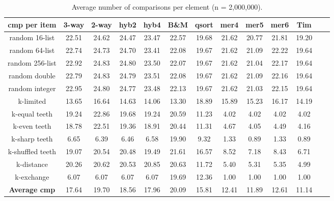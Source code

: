\documentclass[AMA,STIX1COL]{WileyNJD-v2}
\newcommand{\qsort}{\emph{qsort }}
\newcommand{\qsortn}{\emph{qsort}}
\begin{document}

\begin{table}
\caption{Average number of comparisons per element (n = 2,000,000).}
\centering
\begin{tabular}{|c|c|c|c|c|c|c|c|c|c|c|c|c|}
\toprule
cmp per item & 3-way & 2-way & hyb2 & hyb4 & B\&M& qsort & mer4 & mer5 & mer6  & Tim\\
\midrule
random 16-list	&22.51	&24.62&	24.47&	23.47&	22.57&	19.68&	21.62&	20.77&	21.81&	19.20\\
random 64-list&	22.74	&24.73	&24.70	&23.41	&22.08	&19.67	&21.62	&21.09	&22.22	&19.64\\
random 256-list&	22.92&	24.83&	24.80&	23.50&	22.07&	19.67&	21.62&	21.04&	22.17&	19.64\\
random double&	22.79	&24.83	&24.79	&23.51	&22.08	&19.67	&21.62	&21.09	&22.16	&19.64\\
random integer&	22.95	&24.80	&24.77	&23.48	&22.13	&19.67	&21.62	&21.03	&22.15	&19.64\\
k-limited&	13.65	&16.64&	14.63&	14.06&	13.30&	18.89&	15.89&	15.23&	16.17&	14.19\\
k-equal teeth&	19.24	&22.86	&19.68	&19.24	&20.59	&11.23	&4.02	&4.02	&4.02	&4.02\\
k-even teeth&	18.78&	22.51&	19.36&	18.91&	20.44&	11.31&	4.67&	4.05&	4.49&	4.16\\
k-sharp teeth&	6.65	&6.39	&6.46	&6.58	&19.90	&9.32	&1.33	&0.89	&1.33	&0.89\\
k-shuffled teeth&	19.07&	20.54&	20.48&	19.49&	21.61&	16.57&	8.52&	7.18&	8.43&	6.71\\
k-distance&	20.26	&20.62	&20.53	&20.85	&20.63	&11.72	&5.40	&5.31	&5.35&	4.99\\
k-exchange&	6.07&	6.07&	6.07&	6.07&	19.69&	12.36&	1.00&	1.00&	1.00&	1.00\\
\textbf{Average  cmp}&	17.64	&19.70	&18.56	&17.96	&20.09	&15.81	&12.41	&11.89	&12.61	&11.14\\
\bottomrule
\end{tabular}
\label{table4}
\end{table}
\end{document}
